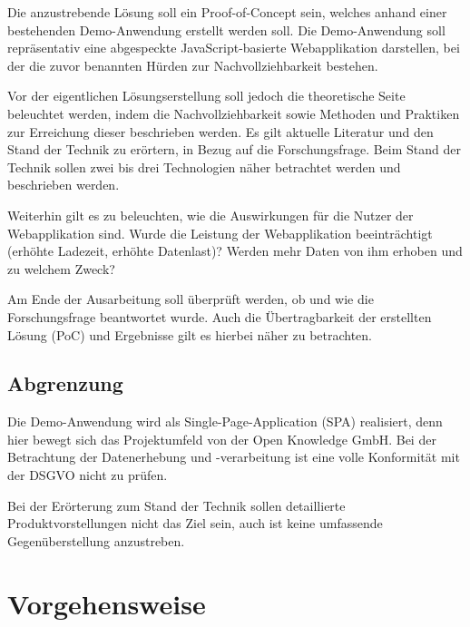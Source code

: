Die anzustrebende Lösung soll ein Proof-of-Concept sein, welches anhand einer bestehenden Demo-Anwendung erstellt werden soll. Die Demo-Anwendung soll repräsentativ eine abgespeckte JavaScript-basierte Webapplikation darstellen, bei der die zuvor benannten Hürden zur Nachvollziehbarkeit bestehen.

Vor der eigentlichen Lösungserstellung soll jedoch die theoretische Seite beleuchtet werden, indem die Nachvollziehbarkeit sowie Methoden und Praktiken zur Erreichung dieser beschrieben werden. Es gilt aktuelle Literatur und den Stand der Technik zu erörtern, in Bezug auf die Forschungsfrage. Beim Stand der Technik sollen zwei bis drei Technologien näher betrachtet werden und beschrieben werden.

Weiterhin gilt es zu beleuchten, wie die Auswirkungen für die Nutzer der Webapplikation sind. Wurde die Leistung der Webapplikation beeinträchtigt (erhöhte Ladezeit, erhöhte Datenlast)? Werden mehr Daten von ihm erhoben und zu welchem Zweck?

Am Ende der Ausarbeitung soll überprüft werden, ob und wie die Forschungsfrage beantwortet wurde. Auch die Übertragbarkeit der erstellten Lösung (PoC) und Ergebnisse gilt es hierbei näher zu betrachten.

\subsection{Abgrenzung}


Die Demo-Anwendung wird als Single-Page-Application (SPA) realisiert, denn hier bewegt sich das Projektumfeld von der Open Knowledge GmbH. Bei der Betrachtung der Datenerhebung und -verarbeitung ist eine volle Konformität mit der DSGVO nicht zu prüfen.

Bei der Erörterung zum Stand der Technik sollen detaillierte Produktvorstellungen nicht das Ziel sein, auch ist keine umfassende Gegenüberstellung anzustreben.

\pagebreak

\section{Vorgehensweise}

